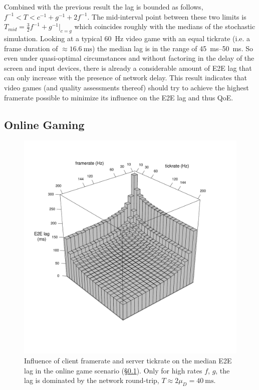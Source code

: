 Combined with the previous result the lag is bounded as follows, $f^{-1} < T < c^{-1}+g^{-1}+2f^{-1}$. The mid-interval point between these two limits is $T_{mid}=\frac{3}{2} f^{-1} + g^{-1}|_{c=g}$ which coincides roughly with the medians of the stochastic simulation. Looking at a typical \SI{60}{\hertz} video game with an equal tickrate (i.e. a frame duration of $\approx \SI{16.6}{\milli\second}$) the median lag is in the range of \SIrange{45}{50}{\milli\second}. So even under quasi-optimal circumstances and without factoring in the delay of the screen and input devices, there is already a considerable amount of \gls{E2E} lag that can only increase with the presence of network delay. This result indicates that video games (and quality assessments thereof) should try to achieve the highest framerate possible to minimize its influence on the \gls{E2E} lag and thus \gls{QoE}.

\subsection{Online Gaming}
\label{subsec:online-gaming}


\begin{figure}[!t]
	\centering
	\vspace{-6mm}
	\includegraphics[width=1.0\columnwidth]{../../../simulation/visualization/e2e-lag-3dbars.pdf}
	\vspace{-15mm}
	\caption{Influence of client framerate and server tickrate on the median \gls{E2E} lag in the online game scenario (§\ref{subsec:online-gaming}). Only for high rates $f$, $g$, the lag is dominated by the network round-trip, $T\approx2\mu_D=\SI{40}{\milli\second}$.}
\label{fig:3dbars-framerate-tickrate-lag}
\end{figure}

